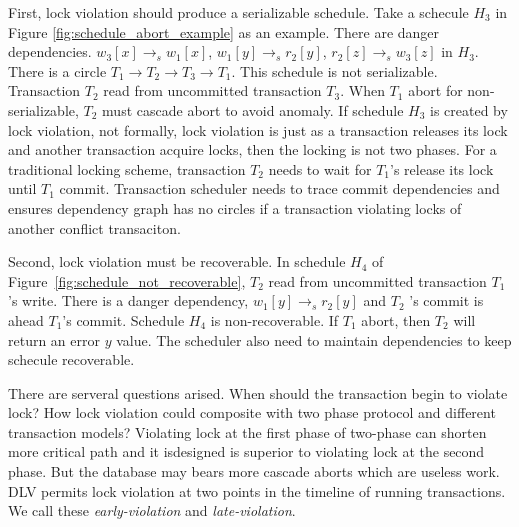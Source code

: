 \documentclass[conference]{IEEEtran}
\begin{document}
First, lock violation should produce a serializable schedule.
Take a schecule ${H_3}$ in Figure \ref{fig:schedule_abort_example} as an example.
There are danger dependencies.
${w_3[x] \rightarrow _s w_1[x]}$,
${w_1[y] \rightarrow _s r_2[y]}$,
${r_2[z] \rightarrow _s w_3[z]}$ in ${H_3}$.
There is a circle ${T_1 \rightarrow T_2 \rightarrow T_3 \rightarrow T_1}$.
This schedule is not serializable.
Transaction ${T_2}$
read from uncommitted transaction ${T_3}$.
When ${T_1}$ abort for non-serializable, ${T_2}$ must cascade abort to avoid anomaly.
If schedule ${H_3}$ is created by lock violation,
not formally, lock violation is just as a transaction releases its lock and another transaction acquire locks, then the locking is not two phases.
For a traditional locking scheme, transaction ${T_2}$ needs to wait for ${T_1}$'s release its lock until ${T_1}$ commit.
Transaction scheduler needs to trace commit dependencies and ensures dependency graph has no circles if a transaction violating locks of another conflict transaciton. 

Second, lock violation must be recoverable.
In schedule ${H_4}$ of Figure~\ref{fig:schedule_not_recoverable}, 
${T_2}$ read from uncommitted transaction ${T_1}$'s write.
There is a danger dependency, ${w_1[y] \rightarrow_s r_2[y]}$ and ${T_2}$ 's commit is ahead ${T_1}$'s commit.
Schedule ${H_4}$ is non-recoverable.
If ${T_1}$ abort, then ${T_2}$ will return an error ${y}$ value.
The scheduler also need to maintain dependencies to keep schecule recoverable. 

There are serveral questions arised.
When should the transaction begin to violate lock?
How lock violation could composite with two phase protocol and different transaction models?
Violating lock at the first phase of two-phase can shorten more critical path and it isdesigned
is superior to
violating lock at the second phase.
But the database may bears more cascade aborts which are useless work.
DLV permits lock violation at two points in the timeline of running transactions.
We call these \emph{early-violation} and \emph{late-violation}.
\end{document}
